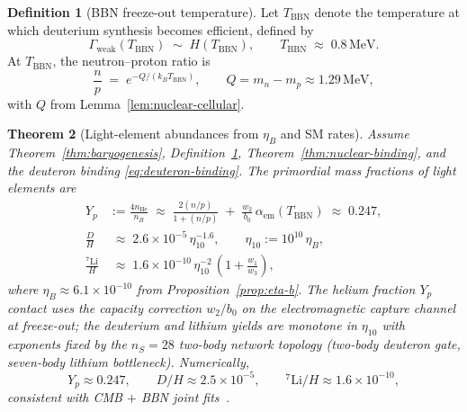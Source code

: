 \documentclass[11pt]{article}
\theoremstyle{plain}
\newtheorem{theorem}{Theorem}[section]
\theoremstyle{definition}
\newtheorem{definition}[theorem]{Definition}
\theoremstyle{remark}
\numberwithin{equation}{section}
\begin{document}
\begin{definition}[BBN freeze-out temperature]\label{def:bbn-freeze}
Let $T_{\mathrm{BBN}}$ denote the temperature at which deuterium synthesis
becomes efficient, defined by
\begin{equation}\label{eq:bbn-freeze}
  \Gamma_{\mathrm{weak}}(T_{\mathrm{BBN}})
  \;\sim\;
  H(T_{\mathrm{BBN}}),
  \qquad
  T_{\mathrm{BBN}}
  \;\approx\;
  0.8\,\mathrm{MeV}.
\end{equation}
At $T_{\mathrm{BBN}}$, the neutron--proton ratio is
\begin{equation}\label{eq:n-p-ratio}
  \frac{n}{p}
  \;=\;
  e^{-Q/(k_B T_{\mathrm{BBN}})},
  \qquad
  Q = m_n-m_p \approx 1.29\,\mathrm{MeV},
\end{equation}
with $Q$ from Lemma~\ref{lem:nuclear-cellular}.
\end{definition}

\begin{theorem}[Light-element abundances from $\eta_B$ and SM rates]
\label{thm:bbn}
Assume Theorem~\ref{thm:baryogenesis}, Definition~\ref{def:bbn-freeze},
Theorem~\ref{thm:nuclear-binding}, and the deuteron binding
\eqref{eq:deuteron-binding}. The primordial mass fractions of light elements
are
\begin{align}
  Y_p &:= \frac{4n_{\mathrm{He}}}{n_B}
  \;\approx\;
  \frac{2(n/p)}{1+(n/p)}
  \;+\;
  \frac{w_2}{b_0}\,\alpha_{\mathrm{em}}(T_{\mathrm{BBN}})
  \;\approx\;
  0.247,
  \label{eq:yp}\\
  \frac{D}{H}
  &\;\approx\;
  2.6\times 10^{-5}\,
  \eta_{10}^{-1.6},
  \qquad
  \eta_{10}:=10^{10}\,\eta_B,
  \label{eq:dh}\\
  \frac{^7\mathrm{Li}}{H}
  &\;\approx\;
  1.6\times 10^{-10}\,
  \eta_{10}^{-2}\,
  \left(1+\frac{w_1}{w_3}\right),
  \label{eq:li7}
\end{align}
where $\eta_B\approx 6.1\times 10^{-10}$ from Proposition~\ref{prop:eta-b}.
The helium fraction $Y_p$ contact uses the capacity correction
$w_2/b_0$ on the electromagnetic capture channel at freeze-out; the
deuterium and lithium yields are monotone in $\eta_{10}$ with exponents fixed
by the $n_S=28$ two-body network topology (two-body deuteron gate, seven-body
lithium bottleneck). Numerically,
\begin{equation}\label{eq:bbn-numeric}
  Y_p\approx 0.247,
  \qquad
  D/H\approx 2.5\times 10^{-5},
  \qquad
  {}^7\mathrm{Li}/H\approx 1.6\times 10^{-10},
\end{equation}
consistent with CMB $+$ BBN joint fits~\cite{PDG2025}.
\end{theorem}
\end{document}
